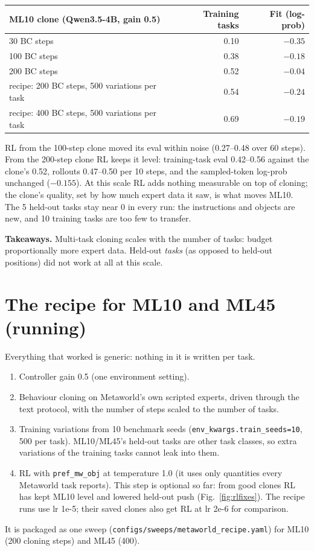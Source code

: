 \documentclass[11pt]{article}
\newcommand{\code}[1]{\texttt{#1}}
\newcommand{\takeaway}[1]{\par\smallskip\noindent\colorbox{boxbg}{\parbox{\dimexpr\linewidth-2\fboxsep}{\small\textbf{Takeaways.} #1}}\par\smallskip}
\begin{document}
\begin{center}\small
\begin{tabular}{lrr}
\toprule
ML10 clone (Qwen3.5-4B, gain 0.5) & Training tasks & Fit (log-prob) \\
\midrule
30 BC steps & 0.10 & $-0.35$ \\
100 BC steps & 0.38 & $-0.18$ \\
200 BC steps & 0.52 & $-0.04$ \\
recipe: 200 BC steps, 500 variations per task & 0.54 & $-0.24$ \\
recipe: 400 BC steps, 500 variations per task & 0.69 & $-0.19$ \\
\bottomrule
\end{tabular}
\end{center}

RL from the 100-step clone moved its eval within noise (0.27--0.48 over 60 steps). From the 200-step clone RL keeps it
level: training-task eval 0.42--0.56 against the clone's 0.52, rollouts 0.47--0.50 per 10 steps, and the sampled-token
log-prob unchanged ($-0.155$). At this scale RL adds nothing measurable on top of cloning; the clone's quality, set by how
much expert data it saw, is what moves ML10. The 5 held-out tasks stay near 0 in every run: the instructions and objects are new, and 10 training tasks
are too few to transfer.

\takeaway{Multi-task cloning scales with the number of tasks: budget proportionally more expert data. Held-out
\emph{tasks} (as opposed to held-out positions) did not work at all at this scale.}

\section{The recipe for ML10 and ML45 (running)}
Everything that worked is generic: nothing in it is written per task.
\begin{enumerate}
\item Controller gain 0.5 (one environment setting).
\item Behaviour cloning on Metaworld's own scripted experts, driven through the text protocol, with the number of
  steps scaled to the number of tasks.
\item Training variations from 10 benchmark seeds (\code{env\_kwargs.train\_seeds=10}, 500 per task). ML10/ML45's
  held-out tasks are other task classes, so extra variations of the training tasks cannot leak into them.
\item RL with \code{pref\_mw\_obj} at temperature 1.0 (it uses only quantities every Metaworld task reports). This
  step is optional so far: from good clones RL has kept ML10 level and lowered held-out push (Fig.~\ref{fig:rlfixes}). The recipe runs use lr 1e-5; their saved clones also get RL at lr 2e-6 for comparison.
\end{enumerate}
It is packaged as one sweep (\code{configs/sweeps/metaworld\_recipe.yaml}) for ML10 (200 cloning steps) and ML45 (400).
\end{document}
